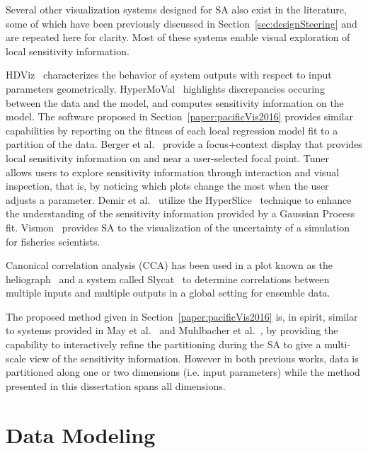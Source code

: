 Several other visualization systems designed for SA also exist in the literature, some of which have been previously discussed in Section~\ref{sec:designSteering} and are repeated here for clarity.
%
Most of these systems enable visual exploration of local sensitivity information.

HDViz~\cite{GerberBremerPascucci2010} characterizes the behavior of system outputs with respect to input parameters geometrically.
%
HyperMoVal~\cite{PiringerBergerKrasser2010} highlights discrepancies occuring between the data and the model, and computes sensitivity information on the model.
%
The software proposed in Section~\ref{paper:pacificVis2016} provides similar capabilities by reporting on the fitness of each local regression model fit to a partition of the data.
%
Berger et al.~\cite{BergerPiringerFilzmoser2011} provide a focus+context display that provides local sensitivity information on and near a user-selected focal point.
%
Tuner~\cite{Torsney-WeirSaadMoller2011} allows users to explore sensitivity information through interaction and visual inspection, that is, by noticing which plots change the most when the user adjusts a parameter.
%
Demir et al.~\cite{DemirWestermann2013} utilize the HyperSlice~\cite{VanWijkVanLiere1993} technique to enhance the understanding of the sensitivity information provided by a Gaussian Process fit.
%
Vismon~\cite{BooshehrianMullrPeterman2012} provides SA to the visualization of the uncertainty of a simulation for fisheries scientists.

Canonical correlation analysis (CCA) has been used in a plot known as the heliograph~\cite{DeganiShaftoOlson2006} and a system called Slycat~\cite{CrossnoSheadSielicki2015} to determine correlations between multiple inputs and multiple outputs in a global setting for ensemble data.

The proposed method given in Section~\ref{paper:pacificVis2016} is, in spirit, similar to systems provided in May et al.~\cite{MayBannachDavey2011} and Muhlbacher et al.~\cite{MuhlbacherPiringer2013}, by providing the capability to interactively refine the partitioning during the SA to give a multi-scale view of the sensitivity information.
%
However in both previous works, data is partitioned along one or two dimensions (i.e. input parameters) while the method presented in this dissertation spans all dimensions.

\section{Data Modeling}
\label{sec:regression}
